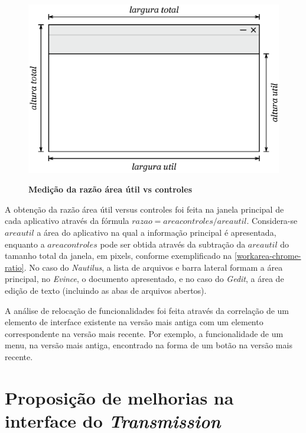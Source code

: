 \begin{figure}[!ht]
  \begin{center}
    \caption{\textbf{Medição da razão área útil vs controles}}
    \includegraphics[scale=0.7]{image/workarea-chrome-ratio.eps}
    \label{workarea-chrome-ratio}
  \end{center}
\end{figure}

A obtenção da razão área útil versus controles foi feita na janela principal de
cada aplicativo através da fórmula $razao = areacontroles / areautil$.
Considera-se $areautil$ a área do aplicativo na qual a informação principal é
apresentada, enquanto a $areacontroles$ pode ser obtida através da subtração da
$areautil$ do tamanho total da janela, em pixels, conforme exemplificado na
\autoref {workarea-chrome-ratio}. No caso do \textit{Nautilus}, a lista de
arquivos e barra lateral formam a área principal, no \textit{Evince}, o
documento apresentado, e no caso do \textit{Gedit}, a área de edição de texto
(incluindo as abas de arquivos abertos).

A análise de relocação de funcionalidades foi feita através da correlação de um
elemento de interface existente na versão mais antiga com um elemento
correspondente na versão mais recente. Por exemplo, a funcionalidade de um menu,
na versão mais antiga, encontrado na forma de um botão na versão mais recente.

\section{Proposição de melhorias na interface do \textit{Transmission}}

